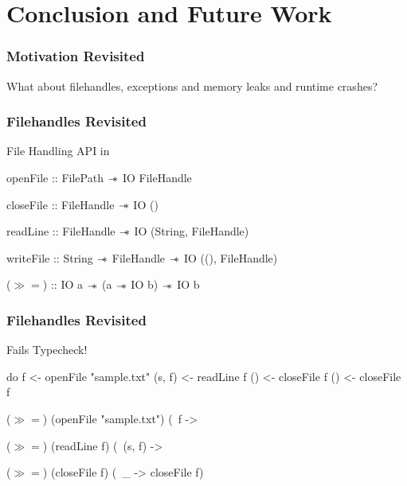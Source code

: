\section{Conclusion and Future Work}\label{sec:conclusion}

\begin{frame}[fragile, c]
  \frametitle{Motivation Revisited}
  \begin{center}
    {\LARGE
      What about filehandles, exceptions and memory leaks and runtime crashes?
    }
\end{center}

\end{frame}

\begin{frame}[fragile, c]
  \frametitle{Filehandles Revisited}
  \begin{center}
  File Handling API in \qub{}
  \begin{haskell}
     openFile  :: FilePath   $\mathrel{-\mkern-6mu*}$ IO FileHandle

     closeFile :: FileHandle $\mathrel{-\mkern-6mu*}$ IO ()

     readLine  :: FileHandle $\mathrel{-\mkern-6mu*}$ IO (String, FileHandle)

     writeFile :: String     $\mathrel{-\mkern-6mu*}$ FileHandle
                             $\mathrel{-\mkern-6mu*}$ IO ((), FileHandle)




     ($\gg\!=$) :: IO a $\mathrel{-\mkern-6mu*}$ (a $\mathrel{-\mkern-6mu*}$ IO b) $\mathrel{-\mkern-6mu*}$ IO b
   \end{haskell}
\end{center}
\end{frame}

\begin{frame}[fragile, c]
  \frametitle{Filehandles Revisited}
  \begin{center}
  {\LARGE \color{white}Fails Typecheck!}

  \begin{haskell}
               do f  <- openFile "sample.txt"
                  (s, f)  <- readLine f
                  () <- closeFile f
                  () <- closeFile f
            \end{haskell}
            \begin{haskell}
               ($\gg\!=$) (openFile "sample.txt") (\ f ->
               
               ($\gg\!=$) (readLine f) (\ (s, f) ->
               
               ($\gg\!=$) (closeFile f) (\ _ -> closeFile f)
            \end{haskell}
          \end{center}

\end{frame}

